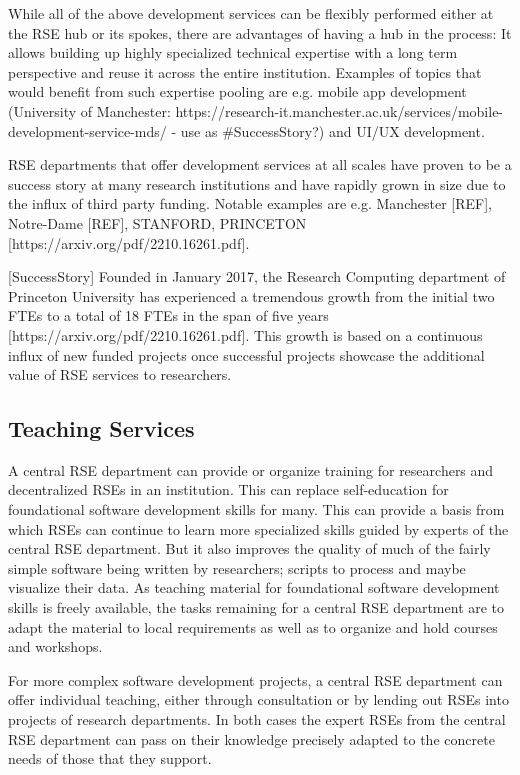 \documentclass{article}
\begin{document}
While all of the above development services can be flexibly performed either at the RSE hub or its spokes, there are advantages of having a hub in the process:
It allows building up highly specialized technical expertise with a long term perspective and reuse it across the entire institution.
Examples of topics that would benefit from such expertise pooling are e.g. mobile app development (University of Manchester: https://research-it.manchester.ac.uk/services/mobile-development-service-mds/ - use as \#SuccessStory?) and UI/UX development.

RSE departments that offer development services at all scales have proven to be a success story at many research institutions and have rapidly grown in size due to the influx of third party funding.
Notable examples are e.g. Manchester [REF], Notre-Dame [REF], STANFORD, PRINCETON [https://arxiv.org/pdf/2210.16261.pdf].

[SuccessStory]
Founded in January 2017, the Research Computing department of Princeton University has experienced a tremendous growth from the initial two FTEs to a total of 18 FTEs in the span of five years [https://arxiv.org/pdf/2210.16261.pdf].
This growth is based on a continuous influx of new funded projects once successful projects showcase the additional value of RSE services to researchers.

\subsection{Teaching Services}

A central RSE department can provide or organize training for researchers and decentralized RSEs in an institution.
This can replace self-education for foundational software development skills for many.
This can provide a basis from which RSEs can continue to learn more specialized skills guided by experts of the central RSE department.
But it also improves the quality of much of the fairly simple software being written by researchers; scripts to process and maybe visualize their data.
As teaching material for foundational software development skills is freely available, the tasks remaining for a central RSE department are to adapt the material to local requirements as well as to organize and hold courses and workshops.

For more complex software development projects, a central RSE department can offer individual teaching, either through consultation or by lending out RSEs into projects of research departments.
In both cases the expert RSEs from the central RSE department can pass on their knowledge precisely adapted to the concrete needs of those that they support.
\end{document}
